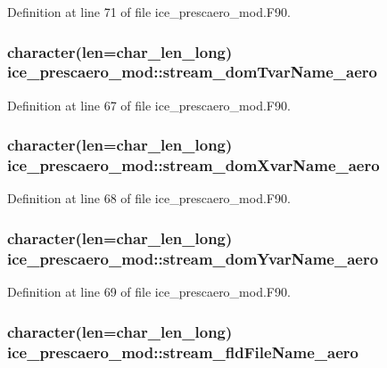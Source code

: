 Definition at line 71 of file ice\_\-prescaero\_\-mod.F90.\hypertarget{namespaceice__prescaero__mod_a73733a5cec61434d5a1da1d83629e601}{
\subsubsection[{stream\_\-domTvarName\_\-aero}]{\setlength{\rightskip}{0pt plus 5cm}character(len=char\_\-len\_\-long) {\bf ice\_\-prescaero\_\-mod::stream\_\-domTvarName\_\-aero}}}
\label{namespaceice__prescaero__mod_a73733a5cec61434d5a1da1d83629e601}


Definition at line 67 of file ice\_\-prescaero\_\-mod.F90.\hypertarget{namespaceice__prescaero__mod_a6ba0f1529c78ceec4eb50dd637ee5a54}{
\subsubsection[{stream\_\-domXvarName\_\-aero}]{\setlength{\rightskip}{0pt plus 5cm}character(len=char\_\-len\_\-long) {\bf ice\_\-prescaero\_\-mod::stream\_\-domXvarName\_\-aero}}}
\label{namespaceice__prescaero__mod_a6ba0f1529c78ceec4eb50dd637ee5a54}


Definition at line 68 of file ice\_\-prescaero\_\-mod.F90.\hypertarget{namespaceice__prescaero__mod_a9e4fb440c2ad241c5a3d034e180fffef}{
\subsubsection[{stream\_\-domYvarName\_\-aero}]{\setlength{\rightskip}{0pt plus 5cm}character(len=char\_\-len\_\-long) {\bf ice\_\-prescaero\_\-mod::stream\_\-domYvarName\_\-aero}}}
\label{namespaceice__prescaero__mod_a9e4fb440c2ad241c5a3d034e180fffef}


Definition at line 69 of file ice\_\-prescaero\_\-mod.F90.\hypertarget{namespaceice__prescaero__mod_a5528b5428fb89c7e220fc959f2c80009}{
\subsubsection[{stream\_\-fldFileName\_\-aero}]{\setlength{\rightskip}{0pt plus 5cm}character(len=char\_\-len\_\-long) {\bf ice\_\-prescaero\_\-mod::stream\_\-fldFileName\_\-aero}}}
\label{namespaceice__prescaero__mod_a5528b5428fb89c7e220fc959f2c80009}


